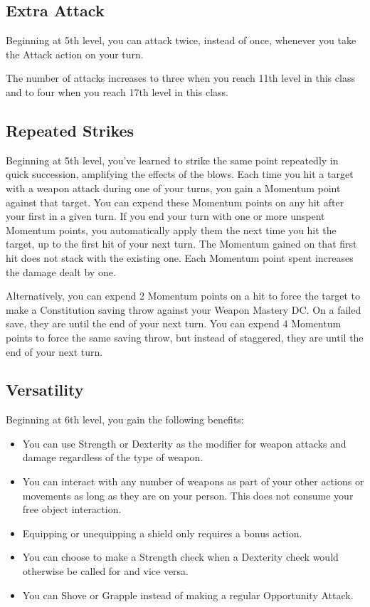 \subsection{Extra Attack}

Beginning at 5th level, you can attack twice, instead of once, whenever you take the Attack action on your turn.

The number of attacks increases to three when you reach 11th level in this class and to four when you reach 17th level in this class.

\subsection{Repeated Strikes}

Beginning at 5th level, you've learned to strike the same point repeatedly in quick succession, amplifying the effects of the blows. Each time you hit a target with a weapon attack during one of your turns, you gain a Momentum point against that target. You can expend these Momentum points on any hit after your first in a given turn. If you end your turn with one or more unspent Momentum points, you automatically apply them the next time you hit the target, up to the first hit of your next turn. The Momentum gained on that first hit does not stack with the existing one. Each Momentum point spent increases the damage dealt by one.

Alternatively, you can expend 2 Momentum points on a hit to force the target to make a Constitution saving throw against your Weapon Mastery DC. On a failed save, they are  until the end of your next turn. You can expend 4 Momentum points to force the same saving throw, but instead of staggered, they are  until the end of your next turn.

\subsection{Versatility}
Beginning at 6th level, you gain the following benefits:
\begin{itemize}
	\item You can use Strength or Dexterity as the modifier for weapon attacks and damage regardless of the type of weapon.
	\item You can interact with any number of weapons as part of your other actions or movements as long as they are on your person. This does not consume your free object interaction.
	\item Equipping or unequipping a shield only requires a bonus action.
	\item You can choose to make a Strength check when a Dexterity check would otherwise be called for and vice versa.
	\item You can Shove or Grapple instead of making a regular Opportunity Attack.
\end{itemize} 

